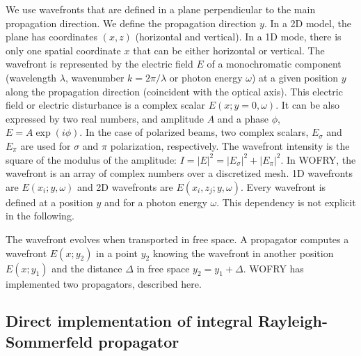 \documentclass{iopconfser}
\newcommand{\todo}[1]{{\color{red}[TODO: "#1'']}}
\begin{document}
We use wavefronts that are defined in a plane perpendicular to the main propagation direction. We define the propagation direction $y$. In a 2D model, the plane has coordinates $(x,z)$ (horizontal and vertical). In a 1D mode, there is only one spatial coordinate $x$ that can be either horizontal or vertical. 
The wavefront is represented by the electric field $E$ of a monochromatic component (wavelength $\lambda$, wavenumber $k = 2 \pi / \lambda$ or photon energy $\omega$) at a given position $y$ along the propagation direction (coincident with the optical axis).
This electric field or electric disturbance is a complex scalar $E(x;y=0,\omega)$. It can be also expressed by two real numbers, and amplitude $A$ and a phase $\phi$,  $E= A \exp{(i\phi)}$. In the case of polarized beams, two complex scalars, $E_\sigma$ and $E_\pi$ are used for $\sigma$ and $\pi$ polarization, respectively.
The wavefront intensity is the square of the modulus of the amplitude: $I=|E|^2=|E_\sigma|^2 + |E_\pi|^2$. In WOFRY, the wavefront is an array of complex numbers over a discretized mesh. 1D wavefronts are $E(x_i;y,\omega)$ and 2D wavefronts are $E(x_i,z_j;y,\omega)$. Every wavefront is defined at a position $y$ and for a photon energy $\omega$. This dependency is not explicit in the following.

The wavefront evolves when transported in free space. A propagator computes a wavefront $E(x;y_2)$ in a point $y_2$ knowing the wavefront in another position $E(x;y_1)$ and the distance $\Delta$ in free space $y_2 = y_1 + \Delta$. WOFRY has implemented two propagators, described here.

\subsection{Direct implementation of integral Rayleigh-Sommerfeld propagator}
\label{sec:integralPropagator}
\end{document}
